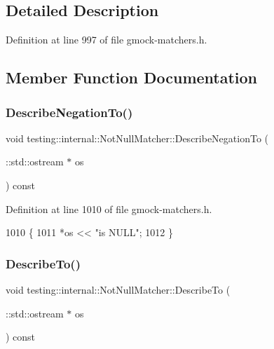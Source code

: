 \subsection{Detailed Description}


Definition at line 997 of file gmock-\/matchers.\+h.



\subsection{Member Function Documentation}
\mbox{\label{classtesting_1_1internal_1_1NotNullMatcher_a5b9c4335e8e4465e48fc73d185402ebd}} 
\subsubsection{\texorpdfstring{Describe\+Negation\+To()}{DescribeNegationTo()}}
{\footnotesize\ttfamily void testing\+::internal\+::\+Not\+Null\+Matcher\+::\+Describe\+Negation\+To (\begin{DoxyParamCaption}\item[{\+::std\+::ostream $\ast$}]{os }\end{DoxyParamCaption}) const\hspace{0.3cm}{\ttfamily [inline]}}



Definition at line 1010 of file gmock-\/matchers.\+h.


\begin{DoxyCode}
1010                                                 \{
1011     *os << \textcolor{stringliteral}{"is NULL"};
1012   \}
\end{DoxyCode}
\mbox{\label{classtesting_1_1internal_1_1NotNullMatcher_ac2ef2de5833c135e74e47e40484442d1}} 
\subsubsection{\texorpdfstring{Describe\+To()}{DescribeTo()}}
{\footnotesize\ttfamily void testing\+::internal\+::\+Not\+Null\+Matcher\+::\+Describe\+To (\begin{DoxyParamCaption}\item[{\+::std\+::ostream $\ast$}]{os }\end{DoxyParamCaption}) const\hspace{0.3cm}{\ttfamily [inline]}}



